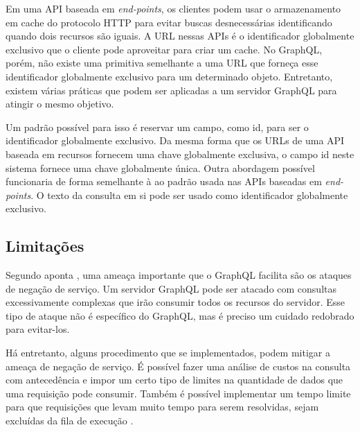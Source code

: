 Em uma API baseada em \textit{end-points}, os clientes podem usar o armazenamento em cache do protocolo HTTP para evitar buscas desnecessárias identificando quando dois recursos são iguais. A URL nessas APIs é o identificador globalmente exclusivo que o cliente pode aproveitar para criar um cache. No GraphQL, porém, não existe uma primitiva semelhante a uma URL que forneça esse identificador globalmente exclusivo para um determinado objeto. Entretanto, existem várias práticas que podem ser aplicadas a um servidor GraphQL para atingir o mesmo objetivo.

Um padrão possível para isso é reservar um campo, como id, para ser o identificador globalmente exclusivo. Da mesma forma que os URLs de uma API baseada em recursos fornecem uma chave globalmente exclusiva, o campo id neste sistema fornece uma chave globalmente única. Outra abordagem possível funcionaria de forma semelhante à ao padrão usada nas APIs baseadas em \textit{end-points}. O texto da consulta em si pode ser usado como identificador globalmente exclusivo. 


\subsection{Limitações}

Segundo aponta , uma ameaça importante que o GraphQL facilita são os ataques de negação de serviço. Um servidor GraphQL pode ser atacado com consultas excessivamente complexas que irão consumir todos os recursos do servidor. Esse tipo de ataque não é específico do GraphQL, mas é preciso um cuidado redobrado para evitar-los.

Há entretanto, alguns procedimento que se implementados, podem mitigar a ameaça de negação de serviço. É possível fazer uma análise de custos na consulta com antecedência e impor um certo tipo de limites na quantidade de dados que uma requisição pode consumir. Também é possível implementar um tempo limite para que requisições que levam muito tempo para serem resolvidas, sejam excluídas da fila de execução .


